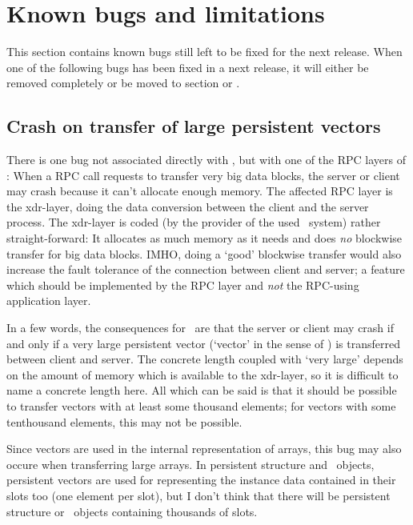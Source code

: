 \section{Known bugs and limitations}

This section contains known bugs still left to be fixed for the next
release. When one of the following bugs has been fixed in a next
release, it will either be removed completely or be moved to section
 or .

\subsection{Crash on transfer of large persistent vectors}

There is one bug not associated directly with \plobwoexcl, but with
one of the RPC layers of \unix: When a RPC call requests to transfer
very big data blocks, the server or client may crash because it can't
allocate enough memory. The affected RPC layer is the xdr-layer, doing
the data conversion between the client and the server process. The
xdr-layer is coded (by the provider of the used \unix\ system) rather
straight-forward: It allocates as much memory as it needs and does
\emph{no} blockwise transfer for big data blocks. IMHO, doing a `good'
blockwise transfer would also increase the fault tolerance of the
connection between client and server; a feature which should be
implemented by the RPC layer and \emph{not} the RPC-using application
layer.

In a few words, the consequences for \plob\ are that the server or
client may crash if and only if a very large persistent vector
(`vector' in the sense of \cl) is transferred between client and
server. The concrete length coupled with `very large' depends on the
amount of memory which is available to the xdr-layer, so it is
difficult to name a concrete length here. All which can be said is
that it should be possible to transfer vectors with at least some
thousand elements; for vectors with some tenthousand elements, this
may not be possible.

Since vectors are used in the internal representation of arrays,
this bug may also occure when transferring large arrays. In persistent
structure and \clos\ objects, persistent vectors are used for
representing the instance data contained in their slots too (one
element per slot), but I don't think that there will be persistent
structure or \clos\ objects containing thousands of slots.

